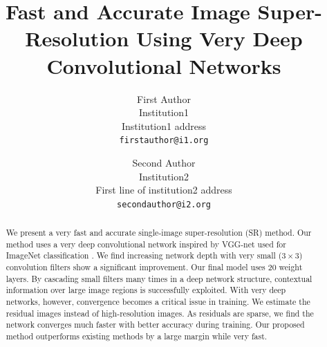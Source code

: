 \documentclass[10pt,twocolumn,letterpaper]{article}
\begin{document}


\title{Fast and Accurate Image Super-Resolution Using Very Deep Convolutional Networks}

\author{First Author\\
	Institution1\\
	Institution1 address\\
	{\tt\small firstauthor@i1.org}
	\and
	Second Author\\
	Institution2\\
	First line of institution2 address\\
	{\tt\small secondauthor@i2.org}
}

\maketitle


\begin{abstract}
We present a very fast and accurate single-image super-resolution (SR) method. Our method uses a very deep convolutional network inspired by VGG-net used for ImageNet classification \cite{simonyan2015very}. We find increasing network depth with very small ($3\times 3$) convolution filters show a significant improvement. Our final model uses 20 weight layers. By cascading small filters many times in a deep network structure, contextual information over large image regions is successfully exploited. With very deep networks, however, convergence becomes a critical issue in training. We estimate the residual images instead of high-resolution images. As residuals are sparse, we find the network converges much faster with better accuracy during training. Our proposed method outperforms existing methods by a large margin while very fast.
\end{abstract}
\end{document}
